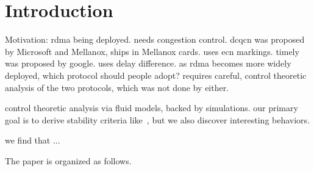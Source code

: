 \section{Introduction}


Motivation: rdma being deployed. needs congestion control. dcqcn was proposed by Microsoft and Mellanox,
ships in Mellanox cards. uses ecn markings. timely was proposed by google. uses
delay difference. as rdma becomes more widely deployed, which protocol should
people adopt? requires careful, control theoretic analysis of the two
protocols, which was not done
by either. 


control theoretic analysis via fluid models, backed by simulations.
our primary goal is to derive stability criteria
like~\cite{dctcp-analysis}, but we also discover interesting behaviors. 

we find that ...


The paper is organized as follows.  
